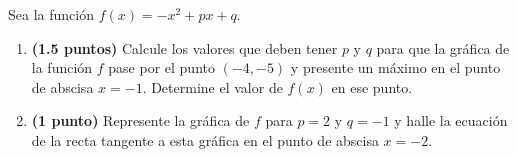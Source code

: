 
Sea la función $f(x)=-x^2+px+q$.
\begin{enumerate}[label=\alph*)]
\item \textbf{(1.5 puntos)} Calcule los valores que deben tener $p$ y $q$ para que la gráfica de la función $f$ pase por el punto $(-4,-5)$ y presente un máximo en el punto de abscisa $x=-1$. Determine el valor de $f(x)$ en ese punto.
\item \textbf{(1 punto)} Represente la gráfica de $f$ para $p=2$ y $q=-1$ y halle la ecuación de la recta tangente a esta gráfica en el punto de abscisa $x=-2$.
\end{enumerate}
